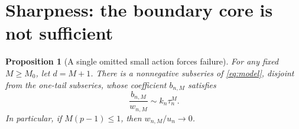 \documentclass[11pt,a4paper]{article}
\numberwithin{equation}{section}
\newtheorem{proposition}[theorem]{Proposition}
\theoremstyle{definition}
\theoremstyle{remark}
\begin{document}
\section{Sharpness: the boundary core is not sufficient}
\label{sec:necessity}

\begin{proposition}[A single omitted small action forces failure]
\label{prop:necessity}
For any fixed $M\ge M_0$, let $d=M+1$. There is a nonnegative subseries
of \eqref{eq:model}, disjoint from the one-tail subseries, whose coefficient
$b_{n,M}$ satisfies
\begin{equation}
 \frac{b_{n,M}}{w_{n,M}}\sim k_n\tau_n^M.
 \label{eq:two-tail-ratio}
\end{equation}
In particular, if $M(p-1)\le1$, then $w_{n,M}/u_n\to0$.
\end{proposition}
\end{document}

